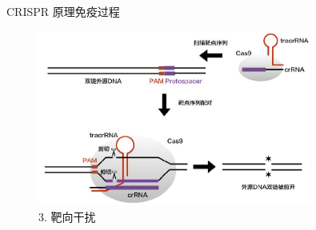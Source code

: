 \documentclass{beamer}
\begin{document}

\begin{frame}{CRISPR 原理}{免疫过程}
		
	\begin{figure}
		\centering
		\includegraphics[width=0.8\textwidth]{img/infect_stage3.jpeg}
		\caption{3. 靶向干扰}
	\end{figure}

\end{frame}

\end{document}
